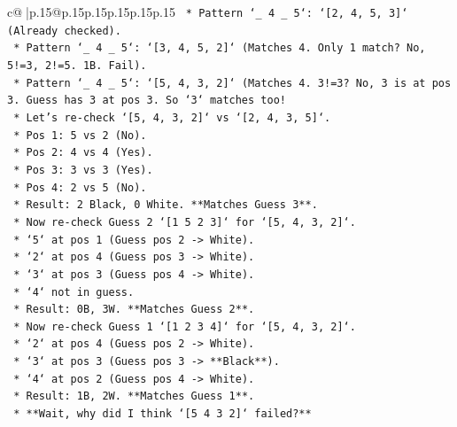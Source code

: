 \documentclass{article}
\begin{document}
{\begin{supertabular}{c@{$\;$}|p{.15\linewidth}@{}p{.15\linewidth}p{.15\linewidth}p{.15\linewidth}p{.15\linewidth}p{.15\linewidth}}
{{{\texttt{                    *   Pattern `\_ 4 \_ 5`: `{[}2, 4, 5, 3{]}` (Already checked).} \\
\texttt{                    *   Pattern `\_ 4 \_ 5`: `{[}3, 4, 5, 2{]}` (Matches 4. Only 1 match? No, 5!=3, 2!=5. 1B. Fail).} \\
\texttt{                    *   Pattern `\_ 4 \_ 5`: `{[}5, 4, 3, 2{]}` (Matches 4. 3!=3? No, 3 is at pos 3. Guess has 3 at pos 3. So `3` matches too!} \\
\texttt{                        *   Let's re{-}check `{[}5, 4, 3, 2{]}` vs `{[}2, 4, 3, 5{]}`.} \\
\texttt{                        *   Pos 1: 5 vs 2 (No).} \\
\texttt{                        *   Pos 2: 4 vs 4 (Yes).} \\
\texttt{                        *   Pos 3: 3 vs 3 (Yes).} \\
\texttt{                        *   Pos 4: 2 vs 5 (No).} \\
\texttt{                        *   Result: 2 Black, 0 White. **Matches Guess 3**.} \\
\texttt{                        *   Now re{-}check Guess 2 `{[}1 5 2 3{]}` for `{[}5, 4, 3, 2{]}`.} \\
\texttt{                            *   `5` at pos 1 (Guess pos 2 {-}> White).} \\
\texttt{                            *   `2` at pos 4 (Guess pos 3 {-}> White).} \\
\texttt{                            *   `3` at pos 3 (Guess pos 4 {-}> White).} \\
\texttt{                            *   `4` not in guess.} \\
\texttt{                            *   Result: 0B, 3W. **Matches Guess 2**.} \\
\texttt{                        *   Now re{-}check Guess 1 `{[}1 2 3 4{]}` for `{[}5, 4, 3, 2{]}`.} \\
\texttt{                            *   `2` at pos 4 (Guess pos 2 {-}> White).} \\
\texttt{                            *   `3` at pos 3 (Guess pos 3 {-}> **Black**).} \\
\texttt{                            *   `4` at pos 2 (Guess pos 4 {-}> White).} \\
\texttt{                            *   Result: 1B, 2W. **Matches Guess 1**.} \\
\texttt{                        *   **Wait, why did I think `{[}5 4 3 2{]}` failed?**} \\
}}}
\end{supertabular}}
\end{document}
